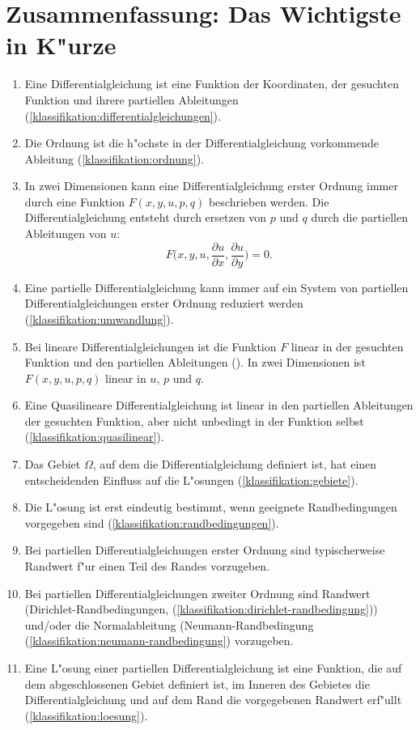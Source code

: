 \section{Zusammenfassung: Das Wichtigste in K"urze}
\begin{enumerate}
\item Eine Differentialgleichung ist eine Funktion
der Koordinaten, der gesuchten Funktion und ihrere partiellen Ableitungen
(\ref{klassifikation:differentialgleichungen}).
\item Die Ordnung ist die h"ochste in der Differentialgleichung vorkommende
Ableitung (\ref{klassifikation:ordnung}).
\item In zwei Dimensionen kann eine Differentialgleichung erster Ordnung
immer durch eine Funktion $F(x,y,u,p,q)$ beschrieben werden. Die
Differentialgleichung entsteht durch ersetzen von $p$ und $q$ durch
die partiellen Ableitungen von $u$:
\[
F\biggl(
x,y, u,
\frac{\partial u}{\partial x},
\frac{\partial u}{\partial y}
\biggr)=0.
\]
\item Eine partielle Differentialgleichung kann immer auf ein System
von partiellen Differentialgleichungen erster Ordnung reduziert werden
(\ref{klassifikation:umwandlung}).
\item Bei lineare Differentialgleichungen ist die Funktion $F$ linear
in der gesuchten Funktion und den partiellen Ableitungen
(\label{klassifikation:linear}). In zwei
Dimensionen ist $F(x,y,u,p,q)$ linear in $u$, $p$ und $q$.
\item Eine Quasilineare Differentialgleichung ist linear in den
partiellen Ableitungen der gesuchten Funktion, aber nicht unbedingt
in der Funktion selbst (\ref{klassifikation:quasilinear}).
\item Das Gebiet $\Omega$, auf dem die Differentialgleichung definiert
ist, hat einen entscheidenden Einfluss auf die L"osungen (\ref{klassifikation:gebiete}).
\item Die L"osung ist erst eindeutig bestimmt, wenn geeignete Randbedingungen
vorgegeben sind (\ref{klassifikation:randbedingungen}). 
\item Bei partiellen Differentialgleichungen erster Ordnung sind typischerweise
Randwert f"ur einen Teil des Randes vorzugeben.
\item Bei partiellen Differentialgleichungen zweiter Ordnung sind
Randwert (Dirichlet-Randbedingungen,
(\ref{klassifikation:dirichlet-randbedingung}))
und/oder die Normalableitung
(Neumann-Randbedingung (\ref{klassifikation:neumann-randbedingung})
vorzugeben.
\item Eine L"osung einer partiellen Differentialgleichung ist eine
Funktion, die auf dem abgeschlossenen Gebiet definiert ist, im Inneren
des Gebietes die Differentialgleichung und auf dem Rand
die vorgegebenen Randwert erf"ullt (\ref{klassifikation:loesung}).

\end{enumerate}
